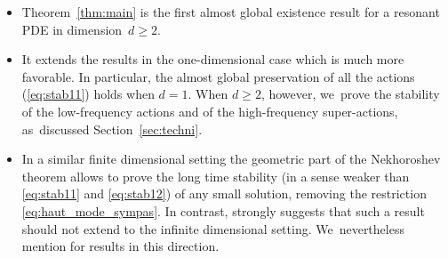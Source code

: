 \documentclass[JEP,XML,SOM,Unicode,published]{cedram}
\theoremstyle{plain}
\theoremstyle{definition}
\newcommand{\1}{\mathbf{1}}
\begin{document}
\begin{itemize}
\item Theorem~\ref{thm:main} is the first almost global existence result for a resonant PDE in dimension~$d\geq2$.
\item It extends the results \cite{Bou00,KillBill} in the one-dimensional case which is much more favorable. In particular, the almost global preservation of all the actions (\ie \eqref{eq:stab11}) holds when $d=1$. When $d\geq2$, however, we~prove the stability of the low-frequency actions and of the high-frequency super-actions, as~discussed Section~\ref{sec:techni}.
\item In a similar finite dimensional setting the geometric part of the Nekhoroshev theorem allows to prove the long time stability (in a sense weaker than \eqref{eq:stab11} and \eqref{eq:stab12}) of any small solution, removing the restriction \eqref{eq:haut_mode_sympas}. In contrast, \cite{BouKal} strongly suggests that such a result should not extend to the infinite dimensional setting. We~nevertheless mention \cite{Bam99,BaG23} for results in this direction.
\end{itemize}
\end{document}
